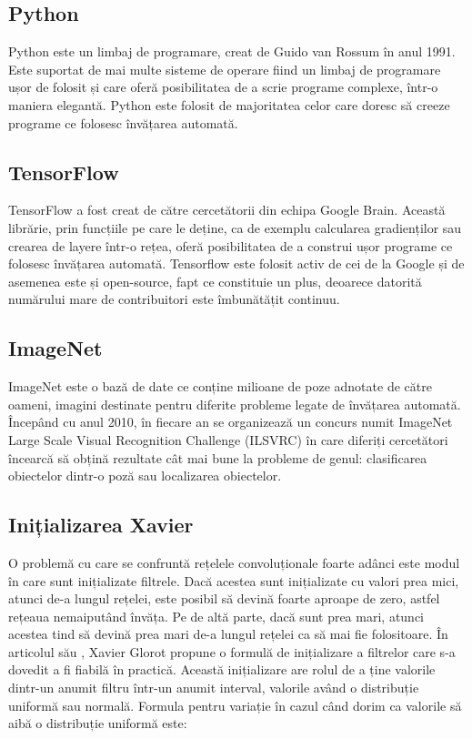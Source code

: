 \subsection{Python}
\label{sb:python}
Python \cite{wiki_python} este un limbaj de programare, creat de Guido van Rossum în anul 1991. Este suportat de mai multe sisteme de operare fiind un limbaj de programare ușor  de folosit și care oferă posibilitatea de a scrie programe complexe, într-o maniera elegantă. Python este folosit de majoritatea celor care doresc să creeze programe ce folosesc învățarea automată.

\subsection{TensorFlow}
\label{sb:tensorflow}
TensorFlow \cite{wiki_tf} a fost creat de către cercetătorii din echipa Google Brain. Această librărie, prin funcțiile pe care le deține, ca de exemplu calcularea gradienților sau crearea de layere într-o rețea, oferă posibilitatea de a construi ușor programe ce folosesc învățarea automată. Tensorflow este folosit activ de cei de la Google și de asemenea este și open-source, fapt ce constituie un plus, deoarece datorită numărului mare de contribuitori este îmbunătățit continuu.

\subsection{ImageNet}
\label{sb:imagenet}
ImageNet \cite{imagenet} este o bază de date ce conține milioane de poze adnotate de către oameni, imagini destinate pentru diferite probleme legate de învățarea automată. Începând cu anul 2010, în fiecare an se organizează un concurs numit ImageNet Large Scale Visual Recognition Challenge (ILSVRC) în care diferiți cercetători încearcă să obțină rezultate cât mai bune la probleme de genul: clasificarea obiectelor dintr-o poză sau localizarea obiectelor.

\subsection{Inițializarea Xavier}
\label{sb:xavier}
\cite{coursera_deep_learning} O problemă cu care se confruntă rețelele convoluționale foarte adânci este modul în care sunt inițializate filtrele. Dacă acestea sunt inițializate cu valori prea mici, atunci de-a lungul rețelei, este posibil să devină foarte aproape de zero, astfel rețeaua nemaiputând învăța. Pe de altă parte, dacă sunt prea mari, atunci acestea tind să devină prea mari de-a lungul rețelei ca să mai fie folositoare. În articolul său \cite{glorot2010}, Xavier Glorot propune o formulă de inițializare a filtrelor care s-a dovedit a fi fiabilă în practică. Această inițializare are rolul de a ține valorile dintr-un anumit filtru într-un anumit interval, valorile având o distribuție uniformă sau normală. Formula pentru variație în cazul când dorim ca valorile să aibă o distribuție uniformă este:

